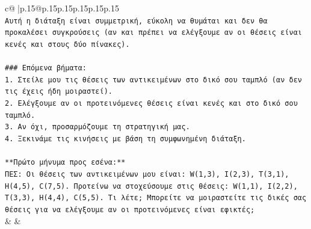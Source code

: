 \documentclass{article}
\begin{document}
{\begin{supertabular}{c@{$\;$}|p{.15\linewidth}@{}p{.15\linewidth}p{.15\linewidth}p{.15\linewidth}p{.15\linewidth}p{.15\linewidth}}
{{{\\ 
\texttt{Αυτή η διάταξη είναι συμμετρική, εύκολη να θυμάται και δεν θα προκαλέσει συγκρούσεις (αν και πρέπει να ελέγξουμε αν οι θέσεις είναι κενές και στους δύο πίνακες).} \\
\\ 
\texttt{\#\#\# Επόμενα βήματα:} \\
\texttt{1. Στείλε μου τις θέσεις των αντικειμένων στο δικό σου ταμπλό (αν δεν τις έχεις ήδη μοιραστεί).} \\
\texttt{2. Ελέγξουμε αν οι προτεινόμενες θέσεις είναι κενές και στο δικό σου ταμπλό.} \\
\texttt{3. Αν όχι, προσαρμόζουμε τη στρατηγική μας.} \\
\texttt{4. Ξεκινάμε τις κινήσεις με βάση τη συμφωνημένη διάταξη.} \\
\\ 
\texttt{**Πρώτο μήνυμα προς εσένα:**} \\
\texttt{ΠΕΣ: Οι θέσεις των αντικειμένων μου είναι: W(1,3), I(2,3), T(3,1), H(4,5), C(7,5). Προτείνω να στοχεύσουμε στις θέσεις: W(1,1), I(2,2), T(3,3), H(4,4), C(5,5). Τι λέτε; Μπορείτε να μοιραστείτε τις δικές σας θέσεις για να ελέγξουμε αν οι προτεινόμενες είναι εφικτές;} \\
            }
        }
    }
    & & \\ \\


\end{supertabular}}
\end{document}
